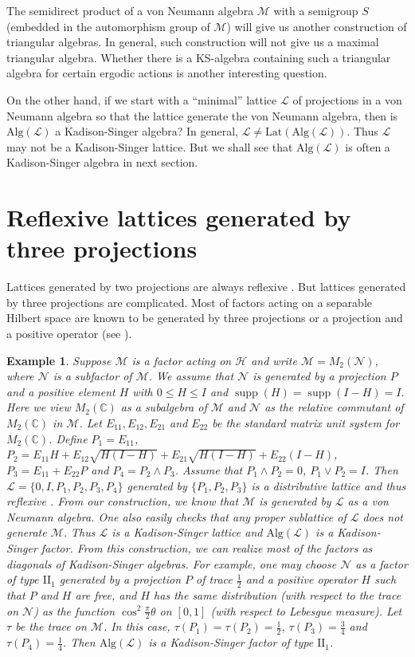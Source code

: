 \documentclass{pnastwo}
\newtheorem{example}{Example}
\newcommand{\HHH}{\mathcal H} %
\newcommand{\LLL}{\mathcal L} %
\newcommand{\M}{\mathcal M}
\newcommand{\NNN}{\mathcal N} %
\newcommand{\supp}{\mathop{\mathrm supp}}
\newcommand{\II}{\mathrm{II}}
\newcommand{\Lat}{\mathrm{Lat}}
\newcommand{\Alg}{\mathrm{Alg}}
\newcommand{\C}{\mathbb C} %
\begin{document}
\begin{article}
The semidirect product of a von Neumann algebra $\M$ with a
semigroup $S$ (embedded in the automorphism group of $\M$) will
give us another construction of triangular algebras. In general,
such construction will not give us a maximal triangular algebra.
Whether there is a KS-algebra containing such a triangular algebra
for certain ergodic actions is another interesting question.


On the other hand, if we start with a ``minimal'' lattice $\LLL$ of
projections in a von Neumann algebra so that the lattice generate
the von Neumann algebra, then is $\Alg(\LLL)$ a Kadison-Singer
algebra? In general, $\LLL\neq\Lat(\Alg(\LLL))$. Thus $\LLL$ may not be
a Kadison-Singer lattice. But we shall see that $\Alg(\LLL)$ is
often a Kadison-Singer algebra in next section.

\section{Reflexive lattices generated by three projections}

Lattices generated by two projections are always
reflexive \cite{H}. But lattices generated by three projections are
complicated. Most of factors acting on a separable Hilbert space
are known to be generated by three projections or a projection and
a positive operator (see \cite{GS}).

\begin{example}
Suppose $\M$ is a factor
acting on $\HHH$ and write $\M=M_2(\NNN)$, where $\NNN$ is a subfactor
of $\M$. We assume that $\NNN$ is generated by a projection $P$ and
a positive element $H$ with $0\le H\le I$ and
$\supp(H)=\supp(I-H)=I$. Here we view $M_2(\C)$ as a subalgebra of
$\M$ and $\NNN$ as the relative commutant of $M_2(\C)$ in $\M$. Let
$E_{11}, E_{12}, E_{21}$ and $E_{22}$ be the standard matrix unit
system for $M_2(\C)$. Define $P_1=E_{11}$, $P_2=E_{11}H+E_{12}
\sqrt{H(I-H)}+E_{21} \sqrt{H(I-H)} +E_{22}(I-H)$,
$P_3=E_{11}+E_{22}P$ and $P_4=P_2\wedge P_3$. Assume that $P_1\wedge
P_2=0$, $P_1\vee P_2=I$. Then $\LLL=\{0,I, P_1, P_2, P_3, P_4\}$
generated by $\{P_1,P_2,P_3\}$ is a distributive lattice and thus
reflexive \cite{Ha}. From our construction, we know that $\M$ is
generated by $\LLL$ as a von Neumann algebra. One also easily checks
that any proper sublattice of $\LLL$ does not generate $\M$. Thus $\LLL$
is a Kadison-Singer lattice and $\Alg(\LLL)$ is a Kadison-Singer
factor. From this construction, we can realize most of the factors
as diagonals of Kadison-Singer algebras. For example, one may choose
$\NNN$ as a factor of type $\II_1$ generated by a projection $P$ of
trace $\frac12$ and a positive operator $H$ such that $P$ and $H$
are free, and $H$ has the same distribution (with respect to the
trace on $\NNN$) as the function $\cos^2\frac\pi2\theta$ on $[0,1]$
(with respect to Lebesgue measure). Let $\tau$ be the trace on $\M$.
In this case, $\tau(P_1)=\tau(P_2)=\frac12$, $\tau(P_3)=\frac34$ and
$\tau(P_4)=\frac14$. Then $\Alg(\LLL)$ is a Kadison-Singer factor of
type $\II_1$.
\end{example}


\end{article}
\end{document}
